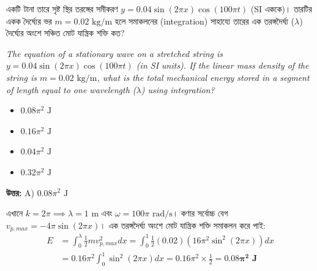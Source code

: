\documentclass[12pt, a4paper]{article}
\begin{document}
\vspace{2em}

\begin{tcolorbox}[questionbox={প্রশ্ন (Question) 7}]
    \noindent
    একটি টানা তারে সৃষ্ট স্থির তরঙ্গের সমীকরণ $y = 0.04 \sin(2\pi x) \cos(100\pi t)$ (SI এককে)। তারটির একক দৈর্ঘ্যের ভর $m = 0.02\text{ kg/m}$ হলে সমাকলনের (integration) সাহায্যে তারের এক তরঙ্গদৈর্ঘ্য ($\lambda$) দৈর্ঘ্যের অংশে সঞ্চিত মোট যান্ত্রিক শক্তি কত?
    
    \vspace{0.8em}
    \begin{english}
    \noindent\textit{\color{darkgray}
    The equation of a stationary wave on a stretched string is $y = 0.04 \sin(2\pi x) \cos(100\pi t)$ (in SI units). If the linear mass density of the string is $m = 0.02\text{ kg/m}$, what is the total mechanical energy stored in a segment of length equal to one wavelength ($\lambda$) using integration?
    }
    \end{english}
\end{tcolorbox}

\begin{itemize}[label={}, leftmargin=1cm, itemsep=0.5em]
    \item[\textbf{A)}] $0.08\pi^2\text{ J}$
    \item[\textbf{B)}] $0.16\pi^2\text{ J}$
    \item[\textbf{C)}] $0.04\pi^2\text{ J}$
    \item[\textbf{D)}] $0.32\pi^2\text{ J}$
\end{itemize}

\vspace{0.5em}
\begin{tcolorbox}[answerbox]
    \textbf{\color{success} উত্তর:} A) $0.08\pi^2\text{ J}$
\end{tcolorbox}
\vspace{1em}

\begin{tcolorbox}[solutionbox={সমাধান (Solution)}]
    \noindent
    এখানে $k = 2\pi \implies \lambda = 1\text{ m}$ এবং $\omega = 100\pi\text{ rad/s}$। কণার সর্বোচ্চ বেগ $v_{p,max} = -4\pi \sin(2\pi x)$। এক তরঙ্গদৈর্ঘ্য অংশে মোট যান্ত্রিক শক্তি সমাকলন করে পাই:
    \begin{align*}
        E &= \int_0^\lambda \frac{1}{2} m v_{p,max}^2 dx = \int_0^1 \frac{1}{2} (0.02) (16\pi^2 \sin^2(2\pi x)) dx \\
        &= 0.16\pi^2 \int_0^1 \sin^2(2\pi x) dx = 0.16\pi^2 \times \frac{1}{2} = \mathbf{0.08\pi^2\text{ J}}
    \end{align*}
\end{tcolorbox}
\end{document}
